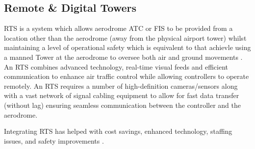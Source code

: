 \subsection{Remote \& Digital Towers}

\gls{RTS} is a system which allows aerodrome \gls{ATC} or \gls{FIS} to be provided from a location other than the aerodrome (away from the physical airport tower) whilst maintaining a level of operational safety which is equivalent to that achievle using a manned Tower at the aerodrome to oversee both air and ground movements \cite{skybrary_rts}. 
An \gls{RTS} combines advanced technology, real-time visual feeds and efficient communication to enhance air traffic control while allowing controllers to operate remotely.
An \gls{RTS} requires a number of high-definition cameras/sensors along with a vast network of signal cabling equipment to allow for fast data transfer (without lag) ensuring seamless communication between the controller and the aerodrome.

Integrating \gls{RTS} has helped with cost savings, enhanced technology, staffing issues, and safety improvements \cite{globalaero2024remote}. 
